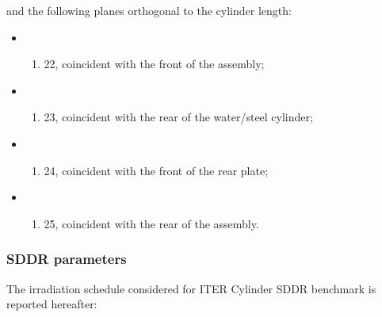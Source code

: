 \documentclass[letterpaper,10pt,english]{sphinxmanual}
\begin{document}
and the following planes orthogonal to the cylinder length:
\begin{itemize}
\item {} \begin{enumerate}
%
\setcounter{enumi}{13}
\item {} 
22, coincident with the front of the assembly;

\end{enumerate}

\item {} \begin{enumerate}
%
\setcounter{enumi}{13}
\item {} 
23, coincident with the rear of the water/steel cylinder;

\end{enumerate}

\item {} \begin{enumerate}
%
\setcounter{enumi}{13}
\item {} 
24, coincident with the front of the rear plate;

\end{enumerate}

\item {} \begin{enumerate}
%
\setcounter{enumi}{13}
\item {} 
25, coincident with the rear of the assembly.

\end{enumerate}

\end{itemize}


\subsubsection{SDDR parameters}
\label{\detokenize{usage/benchmarks:id10}}
The irradiation schedule considered for ITER Cylinder SDDR benchmark is
reported hereafter:
\end{document}

